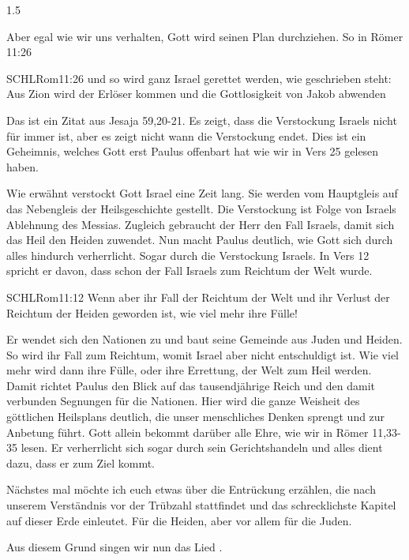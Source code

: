 \documentclass[fontsize=14pt]{../../inc/mybib}
\begin{document}
\begin{spacing}{1.5}
\begin{block}
        Aber egal wie wir uns verhalten, Gott wird seinen Plan durchziehen. So in Römer 11:26
        \begin{bibelbox}{SCHL}{Rom}{11:26}
            und so wird ganz Israel gerettet werden, wie geschrieben steht: Aus Zion wird der Erlöser kommen und die Gottlosigkeit von Jakob abwenden
        \end{bibelbox}
        Das ist ein Zitat aus Jesaja 59,20-21. Es zeigt, dass die Verstockung Israels nicht für immer ist, aber es zeigt nicht wann die Verstockung endet. Dies ist ein Geheimnis, welches Gott erst Paulus offenbart hat wie wir in Vers 25 gelesen haben.        
        \end{block}
        \begin{block}[Fazit]
        Wie erwähnt verstockt Gott Israel eine Zeit lang. Sie werden vom Hauptgleis auf das Nebengleis der Heilsgeschichte gestellt. Die Verstockung ist Folge von Israels Ablehnung des Messias. Zugleich gebraucht der Herr den Fall Israels, damit sich das Heil den Heiden zuwendet. Nun macht Paulus deutlich, wie Gott sich durch alles hindurch verherrlicht. Sogar durch die Verstockung Israels. In Vers 12 spricht er davon, dass schon der Fall Israels zum Reichtum der Welt wurde. 
        \begin{bibelbox}{SCHL}{Rom}{11:12}
            Wenn aber ihr Fall der Reichtum der Welt und ihr Verlust der Reichtum der Heiden geworden ist, wie viel mehr ihre Fülle!
        \end{bibelbox}
        Er wendet sich den Nationen zu und baut seine Gemeinde aus Juden und Heiden. So wird ihr Fall zum Reichtum, womit Israel aber nicht entschuldigt ist. Wie viel mehr wird dann ihre Fülle, oder ihre Errettung, der Welt zum Heil werden. Damit richtet Paulus den Blick auf das tausendjährige Reich und den damit verbunden Segnungen für die Nationen. Hier wird die ganze Weisheit des göttlichen Heilsplans deutlich, die unser menschliches Denken sprengt und zur Anbetung führt. Gott allein bekommt darüber alle Ehre, wie wir in Römer 11,33-35 lesen. Er verherrlicht sich sogar durch sein Gerichtshandeln und alles dient dazu, dass er zum Ziel kommt.
    \end{block}

    Nächstes mal möchte ich euch etwas über die Entrückung erzählen, die nach unserem Verständnis vor der Trübzahl stattfindet und das schrecklichste Kapitel auf dieser Erde einleutet. Für die Heiden, aber vor allem für die Juden.

    Aus diesem Grund singen wir nun das Lied 
    .
\end{spacing}
\end{document}
